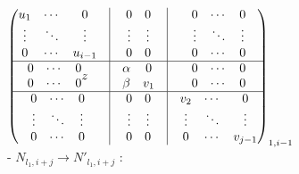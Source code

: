 $
\begin{pmatrix}
		\begin{matrix} 
			u_{1} & \cdots & 0 \\ 
			\vdots & \ddots & \vdots\\
			0 & \cdots & u_{i-1}
		\end{matrix} & \vline &
		\begin{matrix}
			0&0\\
			\vdots&\vdots\\
			0&0
		\end{matrix}& \vline &
		\begin{matrix} 
			0 & \cdots & 0 \\ 
			\vdots & \ddots & \vdots\\
			0 & \cdots & 0
		\end{matrix}\\
		\hline
		\begin{matrix}
			0&\cdots&0\\
			0&\cdots&0
		\end{matrix}z
		& \vline &
		\begin{matrix}
			\alpha & 0\\
			\beta & v_1
		\end{matrix} & \vline&
		\begin{matrix}
			0&\cdots&0\\
			0&\cdots&0
		\end{matrix}\\
		\hline
		\begin{matrix} 
			0 & \cdots & 0 \\ 
			\vdots & \ddots & \vdots\\
			0 & \cdots & 0
		\end{matrix} & \vline &
		\begin{matrix}
			0&0\\
			\vdots&\vdots\\
			0&0
		\end{matrix}& \vline &
		\begin{matrix} 
			v_2 & \cdots & 0 \\ 
			\vdots & \ddots & \vdots\\
			0 & \cdots & v_{j-1}
		\end{matrix}
		
\end{pmatrix}_{1,i -1}
$\\
- $N_{l_1,i+j}\rightarrow N'_{l_1,i+j}$ : 

